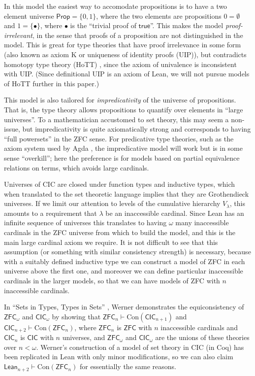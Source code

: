 In this model the easiest way to accomodate propositions is to have a two element universe $\mathsf{Prop}=\{0,1\}$, where the two elements are propositions $0=\emptyset$ and $1=\{\bullet\}$, where $\bullet$ is the ``trivial proof of $\mathsf{true}$''. This makes the model \emph{proof-irrelevant}, in the sense that proofs of a proposition are not distinguished in the model. This is great for type theories that have proof irrelevance in some form (also known as axiom K or uniqueness of identity proofs (UIP)), but contradicts homotopy type theory (HoTT) \cite{hottbook}, since the axiom of univalence is inconsistent with UIP. (Since definitional UIP is an axiom of Lean, we will not pursue models of HoTT further in this paper.)

This model is also tailored for \emph{impredicativity} of the universe of propositions. That is, the type theory allows propositions to quantify over elements in ``large universes''. To a mathematician accustomed to set theory, this may seem a non-issue, but impredicativity is quite axiomatically strong and corresponds to having ``full powersets'' in the ZFC sense. For predicative type theories, such as the axiom system used by Agda \cite{agda}, the impredicative model will work but is in some sense ``overkill''; here the preference is for models based on partial equivalence relations on terms, which avoids large cardinals.

Universes of CIC are closed under function types and inductive types, which when translated to the set theoretic language implies that they are Grothendieck universes. If we limit our attention to levels of the cumulative hierarchy $V_\lambda$, this amounts to a requirement that $\lambda$ be an inaccessible cardinal. Since Lean has an infinite sequence of universes this translates to having $\omega$ many inaccessible cardinals in the ZFC universe from which to build the model, and this is the main large cardinal axiom we require. It is not difficult to see that this assumption (or something with similar consistency strength) is necessary, because with a suitably defined inductive type we can construct a model of ZFC in each universe above the first one, and moreover we can define particular inaccessible cardinals in the larger models, so that we can have models of ZFC with $n$ inaccessible cardinals.

In ``Sets in Types, Types in Sets'' \cite{setsintypes}, Werner demonstrates the equiconsistency of $\mathsf{ZFC}_\omega$ and $\mathsf{CIC}_\omega$ by showing that $\mathsf{ZFC}_n\vdash\mathrm{Con}(\mathsf{CIC}_{n+1})$ and $\mathsf{CIC}_{n+2}\vdash\mathrm{Con}(\mathsf{ZFC}_n)$, where $\mathsf{ZFC}_n$ is $\mathsf{ZFC}$ with $n$ inaccessible cardinals and $\mathsf{CIC}_n$ is $\mathsf{CIC}$ with $n$ universes, and $\mathsf{ZFC}_\omega$ and $\mathsf{CIC}_\omega$ are the unions of these theories over $n<\omega$. Werner's construction of a model of set theory in CIC (in Coq) has been replicated in Lean with only minor modifications, so we can also claim $\mathsf{Lean}_{n+2}\vdash\mathrm{Con}(\mathsf{ZFC}_n)$ for essentially the same reasons.

